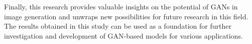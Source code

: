 \noindent Finally, this research provides valuable insights on the potential of GANs in image generation and unwraps new possibilities for future research in this field. The results obtained in this study can be used as a foundation for further investigation and development of GAN-based models for various applications.